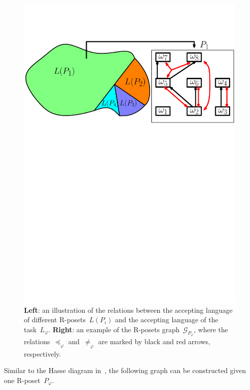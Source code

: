 \begin{figure}[t!]
	\includegraphics[width=0.85\linewidth]{figures/poset_language2.pdf}
	\centering
\caption{\textbf{Left}:
an illustration of the relations between the accepting
language of different R-posets~$L(P_i)$
and the accepting language of the task~$L_\varphi$.
\textbf{Right}:
an example of the R-posets graph~$\mathcal{G}_{P_\varphi}$,
where the relations~$\preceq_{\varphi}$ and~$\neq_{\varphi}$
are marked by black and red arrows, respectively.}
\label{fig:poset_language}
\end{figure}

Similar to the Hasse diagram in~\citep{simovici2008mathematical},
the following graph can be constructed given one R-poset~$P_{\varphi}$.

